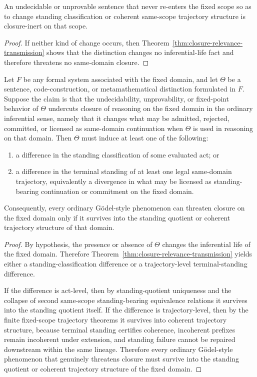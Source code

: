 \begin{corollary}
An undecidable or unprovable sentence that never re-enters the fixed scope so as to change standing classification or coherent same-scope trajectory structure is closure-inert on that scope.
\end{corollary}

\begin{proof}
If neither kind of change occurs, then Theorem~\ref{thm:closure-relevance-transmission} shows that the distinction changes no inferential-life fact and therefore threatens no same-domain closure.
\end{proof}

\begin{theorem}
\label{thm:inferential-necessity-closure-distinctions}
Let $F$ be any formal system associated with the fixed domain, and let $\Theta$ be a sentence, code-construction, or metamathematical distinction formulated in $F$. Suppose the claim is that the undecidability, unprovability, or fixed-point behavior of $\Theta$ undercuts closure of reasoning on the fixed domain in the ordinary inferential sense, namely that it changes what may be admitted, rejected, committed, or licensed as same-domain continuation when $\Theta$ is used in reasoning on that domain. Then $\Theta$ must induce at least one of the following:
\begin{enumerate}
  \item a difference in the standing classification of some evaluated act; or
  \item a difference in the terminal standing of at least one legal same-domain trajectory, equivalently a divergence in what may be licensed as standing-bearing continuation or commitment on the fixed domain.
\end{enumerate}
Consequently, every ordinary G\"odel-style phenomenon can threaten closure on the fixed domain only if it survives into the standing quotient or coherent trajectory structure of that domain.
\end{theorem}

\begin{proof}
By hypothesis, the presence or absence of $\Theta$ changes the inferential life of the fixed domain. Therefore Theorem~\ref{thm:closure-relevance-transmission} yields either a standing-classification difference or a trajectory-level terminal-standing difference.

If the difference is act-level, then by standing-quotient uniqueness and the collapse of second same-scope standing-bearing equivalence relations it survives into the standing quotient itself. If the difference is trajectory-level, then by the finite fixed-scope trajectory theorems it survives into coherent trajectory structure, because terminal standing certifies coherence, incoherent prefixes remain incoherent under extension, and standing failure cannot be repaired downstream within the same lineage. Therefore every ordinary G\"odel-style phenomenon that genuinely threatens closure must survive into the standing quotient or coherent trajectory structure of the fixed domain.
\end{proof}

